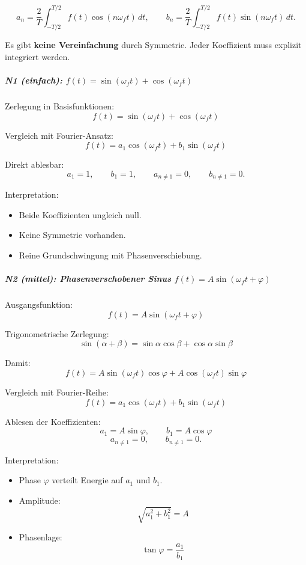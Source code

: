 \[
a_n=\frac{2}{T}\int_{-T/2}^{T/2} f(t)\cos(n\omega_f t)\,dt,
\qquad
b_n=\frac{2}{T}\int_{-T/2}^{T/2} f(t)\sin(n\omega_f t)\,dt.
\]

Es gibt \textbf{keine Vereinfachung} durch Symmetrie.  
Jeder Koeffizient muss explizit integriert werden.

\subparagraph{N1 (einfach): $f(t)=\sin(\omega_f t)+\cos(\omega_f t)$}

Zerlegung in Basisfunktionen:
\[
f(t)=\sin(\omega_f t)+\cos(\omega_f t)
\]

Vergleich mit Fourier-Ansatz:
\[
f(t)=a_1\cos(\omega_f t)+b_1\sin(\omega_f t)
\]

Direkt ablesbar:
\[
\boxed{a_1=1},\qquad \boxed{b_1=1},
\qquad
\boxed{a_{n\neq 1}=0},\qquad \boxed{b_{n\neq 1}=0}.
\]

Interpretation:
\begin{itemize}
    \item Beide Koeffizienten ungleich null.
    \item Keine Symmetrie vorhanden.
    \item Reine Grundschwingung mit Phasenverschiebung.
\end{itemize}

\subparagraph{N2 (mittel): Phasenverschobener Sinus $f(t)=A\sin(\omega_f t+\varphi)$}

Ausgangsfunktion:
\[
f(t)=A\sin(\omega_f t+\varphi)
\]

Trigonometrische Zerlegung:
\[
\sin(\alpha+\beta)=\sin\alpha\cos\beta+\cos\alpha\sin\beta
\]

Damit:
\[
f(t)=A\sin(\omega_f t)\cos\varphi + A\cos(\omega_f t)\sin\varphi
\]

Vergleich mit Fourier-Reihe:
\[
f(t)=a_1\cos(\omega_f t)+b_1\sin(\omega_f t)
\]

Ablesen der Koeffizienten:
\[
\boxed{a_1=A\sin\varphi},\qquad
\boxed{b_1=A\cos\varphi}
\]
\[
\boxed{a_{n\neq 1}=0},\qquad \boxed{b_{n\neq 1}=0}.
\]

Interpretation:
\begin{itemize}
    \item Phase $\varphi$ verteilt Energie auf $a_1$ und $b_1$.
    \item Amplitude:
    \[
    \sqrt{a_1^2+b_1^2}=A
    \]
    \item Phasenlage:
    \[
    \tan\varphi=\frac{a_1}{b_1}
    \]
\end{itemize}

